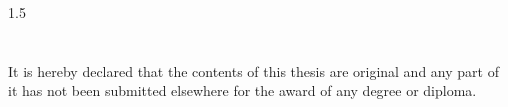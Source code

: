 \begin{spacing}{1.5}
\section*{}
It is hereby declared that the contents of this thesis are original and any part of it has not been submitted elsewhere for the award of any degree or diploma.
\vspace{1in}
\begingroup
\renewcommand{\arraystretch}{2} %
\begin{table}[ht]
\centering
{}
\end{table}



\endgroup
\end{spacing}
